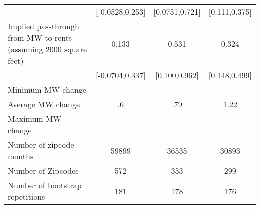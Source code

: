 {\begin{tabular}{l*{3}{c}}
            &       [-0.0528,0.253]         &        [0.0751,0.721]         &         [0.111,0.375]         \\
[1em]
Implied passthrough from MW to rents (assuming 2000 square feet)&                 0.133         &                 0.531\sym{*}  &                 0.324\sym{***}\\
            &       [-0.0704,0.337]         &         [0.100,0.962]         &         [0.148,0.499]         \\
\hline
Minimum MW change&                               &                               &                               \\
Average MW change&                    .6         &                   .79         &                  1.22         \\
Maximum MW change&                               &                               &                               \\
Number of zipcode-months&                 59899         &                 36535         &                 30893         \\
Number of Zipcodes&                   572         &                   353         &                   299         \\
Number of bootstrap repetitions&                   181         &                   178         &                   176         \\
\hline\hline
\end{tabular}
}
